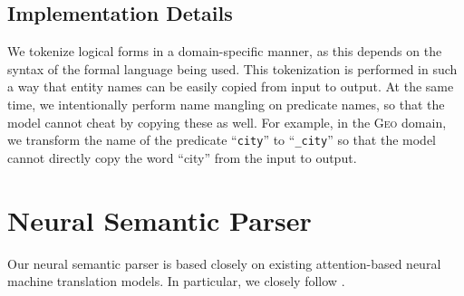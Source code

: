 \documentclass[11pt,letterpaper]{article}
\newcommand{\geo}{\textsc{Geo}\xspace}
\newcommand\pl[1]{\textcolor{red}{[PL: #1]}}
\begin{document}

\subsection{Implementation Details}
We tokenize logical forms in a domain-specific manner,
as this depends on the syntax of the formal language being used.
This tokenization is performed in such a way that
entity names can be easily copied from input to output.
At the same time, we intentionally perform name mangling on predicate names,
so that the model cannot cheat by copying these as well.
For example, in the \geo domain, we transform the name
of the predicate ``\texttt{city}'' to ``\texttt{\_city}''
so that the model cannot directly copy the word ``city'' from the input 
to output.

\section{Neural Semantic Parser}
Our neural semantic parser is based closely on existing
attention-based neural machine translation models.
In particular, we closely follow \cite{luong2015translation}.
\end{document}
